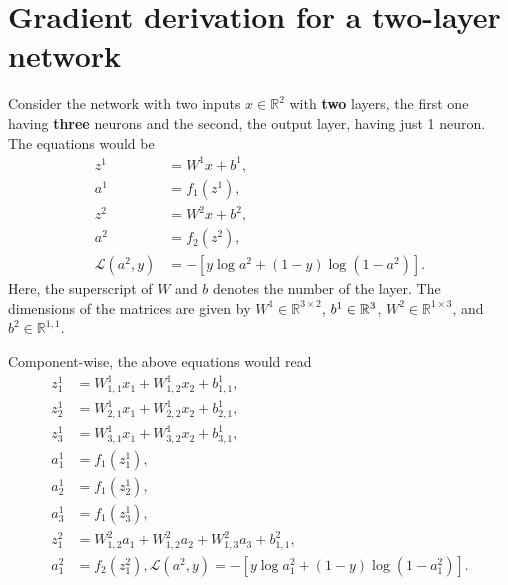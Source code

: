 \documentclass[a4paper,11pt]{article}
\newcommand{\of}[1]{\left( {#1} \right)}
\newcommand{\ofs}[1]{\left[ {#1} \right]}
\begin{document}
\section*{Gradient derivation for a two-layer network}
Consider the network with two inputs $x\in\mathbb{R}^2$ with {\bf two}
layers, the first one having {\bf three} neurons and the second, the
output layer, having just 1 neuron. The equations would be
\[
\begin{split}
z^1 &= W^1 x + b^1,\\
a^1 &= f_1\of{z^1},\\
z^2 &= W^2 x + b^2,\\
a^2 &= f_2(z^2),\\
\mathcal{L}\of{a^2, y} &= - \ofs{y\log a^2 + \of{1-y} \log\of{1 - a^2}}.
\end{split}
\]
Here, the superscript of $W$ and $b$ denotes the number of the layer.
The dimensions of the matrices are given by $W^1 \in
\mathbb{R}^{3\times 2}$, $b^1 \in \mathbb{R}^{3 \time 1}$, $W^2 \in
\mathbb{R}^{1 \times 3}$, and $b^2 \in \mathbb{R}^{1,1}$.

Component-wise, the above equations would read
\[
\begin{split}
z^1_1 &= W^1_{1,1} x_1 + W^1_{1,2} x_2 + b^1_{1,1},\\
z^1_2 &= W^1_{2,1} x_1 + W^1_{2,2} x_2 + b^1_{2,1},\\
z^1_3 &= W^1_{3,1} x_1 + W^1_{3,2} x_2 + b^1_{3,1},\\
a^1_1 &= f_1\of{z^1_1},\\
a^1_2 &= f_1\of{z^1_2},\\
a^1_3 &= f_1\of{z^1_3},\\
z^2_1 &= W^2_{1,2} a_1 + W^2_{1,2} a_2 + W^2_{1,3} a_3 + b^2_{1,1},\\
a^2_1 &= f_2\of{z^2_1},
\mathcal{L}\of{a^2,y} = -\ofs{y\log{a^2_1} + \of{1-y}\log\of{1 - a^2_1}}.
\end{split}
\]
\end{document}

